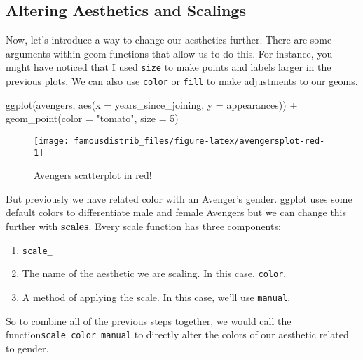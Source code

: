 \documentclass[
]{article}
\newenvironment{Shaded}{\begin{snugshade}}{\end{snugshade}}
\newcommand{\AttributeTok}[1]{\textcolor[rgb]{0.77,0.63,0.00}{#1}}
\newcommand{\DecValTok}[1]{\textcolor[rgb]{0.00,0.00,0.81}{#1}}
\newcommand{\FunctionTok}[1]{\textcolor[rgb]{0.00,0.00,0.00}{#1}}
\newcommand{\NormalTok}[1]{#1}
\newcommand{\SpecialCharTok}[1]{\textcolor[rgb]{0.00,0.00,0.00}{#1}}
\newcommand{\StringTok}[1]{\textcolor[rgb]{0.31,0.60,0.02}{#1}}
\providecommand{\tightlist}{%
  \setlength{\itemsep}{0pt}\setlength{\parskip}{0pt}}
\begin{document}
\hypertarget{altering-aesthetics-and-scalings}{%
\subsection{Altering Aesthetics and Scalings}\label{altering-aesthetics-and-scalings}}

Now, let's introduce a way to change our aesthetics further. There are some arguments within geom functions that allow us to do this. For instance, you might have noticed that I used \texttt{size} to make points and labels larger in the previous plots. We can also use \texttt{color} or \texttt{fill} to make adjustments to our geoms.

\begin{Shaded}
\begin{Highlighting}[]
\FunctionTok{ggplot}\NormalTok{(avengers, }\FunctionTok{aes}\NormalTok{(}\AttributeTok{x =}\NormalTok{ years\_since\_joining,}
                     \AttributeTok{y =}\NormalTok{ appearances)) }\SpecialCharTok{+}
  \FunctionTok{geom\_point}\NormalTok{(}\AttributeTok{color =} \StringTok{"tomato"}\NormalTok{, }\AttributeTok{size =} \DecValTok{5}\NormalTok{)}
\end{Highlighting}
\end{Shaded}

\begin{figure}

{\centering \texttt{[image: famousdistrib\_files/figure-latex/avengersplot-red-1]} 

}

\caption{Avengers scatterplot in red!}\label{fig:avengersplot-red}
\end{figure}

But previously we have related color with an Avenger's gender. ggplot uses some default colors to differentiate male and female Avengers but we can change this further with \textbf{scales}. Every scale function has three components:

\begin{enumerate}
\def\labelenumi{\arabic{enumi}.}
\tightlist
\item
  \texttt{scale\_}
\item
  The name of the aesthetic we are scaling. In this case, \texttt{color}.
\item
  A method of applying the scale. In this case, we'll use \texttt{manual}.
\end{enumerate}

So to combine all of the previous steps together, we would call the function\texttt{scale\_color\_manual} to directly alter the colors of our aesthetic related to gender.
\end{document}
